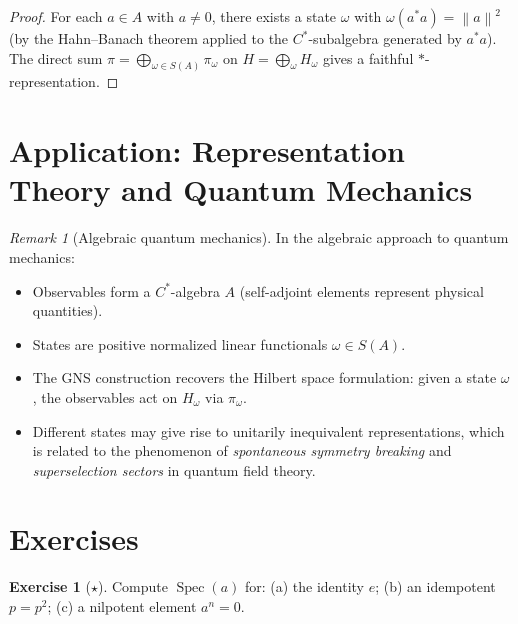 \documentclass[a4paper,12pt]{book}
\DeclareMathOperator{\Spec}{Spec}
\newcommand{\norm}[1]{\left\| #1 \right\|}
\theoremstyle{definition}
\newtheorem{exercise}{Exercise}[chapter]
\theoremstyle{plain}
\theoremstyle{remark}
\newtheorem{remark}[definition]{Remark}
\begin{document}
\begin{proof}
For each $a \in A$ with $a \ne 0$, there exists a state $\omega$ with
$\omega(a^*a) = \norm{a}^2$ (by the Hahn--Banach theorem applied to the
$C^*$-subalgebra generated by $a^*a$). The direct sum
$\pi = \bigoplus_{\omega \in S(A)} \pi_\omega$ on
$H = \bigoplus_\omega H_\omega$ gives a faithful $*$-representation.
\end{proof}


\section{Application: Representation Theory and Quantum Mechanics}
\label{sec:cstar-qm}


\begin{remark}[Algebraic quantum mechanics]
In the algebraic approach to quantum mechanics:
\begin{itemize}
  \item Observables form a $C^*$-algebra $A$ (self-adjoint elements represent
        physical quantities).
  \item States are positive normalized linear functionals $\omega \in S(A)$.
  \item The GNS construction recovers the Hilbert space formulation: given a
        state $\omega$, the observables act on $H_\omega$ via $\pi_\omega$.
  \item Different states may give rise to unitarily inequivalent representations,
        which is related to the phenomenon of \emph{spontaneous symmetry breaking}
         and \emph{superselection sectors}
         in quantum field theory.
\end{itemize}
\end{remark}


\section{Exercises}

\begin{exercise}[$\star$]\label{exo:spectrum-examples}
Compute $\Spec(a)$ for: (a) the identity $e$; (b) an idempotent $p = p^2$;
(c) a nilpotent element $a^n = 0$.
\end{exercise}
\end{document}
